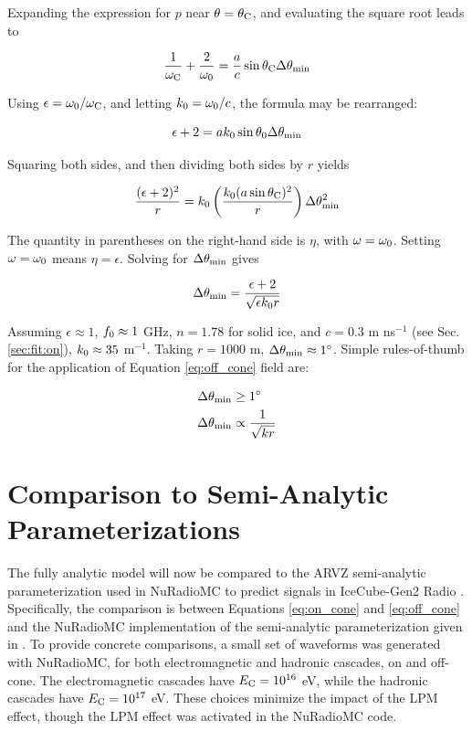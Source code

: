 \documentclass[amsmath,amssymb,aps,prd,10pt,twocolumn]{revtex4}
\begin{document}
Expanding the expression for $p$ near $\theta = \theta_{\rm C}$, and evaluating the square root leads to

\begin{equation}
\frac{1}{\omega_{\rm C}} + \frac{2}{\omega_{\rm 0}} = \frac{a}{c}\sin\theta_{\rm C} \Delta\theta_{\rm min}
\end{equation}

Using $\epsilon = \omega_{\rm 0}/\omega_{\rm C}$, and letting $k_{\rm 0} = \omega_{\rm 0}/c$, the formula may be rearranged:

\begin{equation}
\epsilon + 2 = a k_{\rm 0} \sin\theta_{\rm 0}\Delta\theta_{\rm min}
\end{equation}

Squaring both sides, and then dividing both sides by $r$ yields

\begin{equation}
\frac{(\epsilon+2)^2}{r} = k_{\rm 0} \left(\frac{k_{\rm 0} (a\sin\theta_{\rm C})^2}{r}\right)\Delta\theta^2_{\rm min}
\end{equation}

The quantity in parentheses on the right-hand side is $\eta$, with $\omega = \omega_{\rm 0}$.  Setting $\omega = \omega_{\rm 0}$ means $\eta = \epsilon$.  Solving for $\Delta\theta_{\rm min}$ gives

\begin{equation}
\Delta\theta_{\rm min} = \frac{\epsilon+2}{\sqrt{\epsilon k_{\rm 0} r}}
\end{equation}

Assuming $\epsilon \approx 1$, $f_{\rm 0} \approx 1$ GHz, $n = 1.78$ for solid ice, and $c = 0.3$ m ns$^{-1}$ (see Sec. \ref{sec:fit:on}), $k_{\rm 0} \approx 35$ m$^{-1}$.  Taking $r = 1000$ m, $\Delta\theta_{\rm min} \approx 1^{\circ}$.  Simple rules-of-thumb for the application of Equation \ref{eq:off_cone} field are:

\begin{align}
\Delta\theta_{\rm min} &\geq 1^{\circ} \\
\Delta\theta_{\rm min} &\propto \frac{1}{\sqrt{kr}}
\end{align}

\section{Comparison to Semi-Analytic Parameterizations}
\label{sec:fit}

The fully analytic model will now be compared to the ARVZ semi-analytic parameterization used in NuRadioMC to predict signals in IceCube-Gen2 Radio \cite{10.1140/epjc/s10052-020-7612-8}.  Specifically, the comparison is between Equations \ref{eq:on_cone} and \ref{eq:off_cone} and the NuRadioMC implementation of the semi-analytic parameterization given in \cite{PhysRevD.101.083005}.  To provide concrete comparisons, a small set of waveforms was generated with NuRadioMC, for both electromagnetic and hadronic cascades, on and off-cone.  The electromagnetic cascades have $E_{\rm C} = 10^{16}$ eV, while the hadronic cascades have $E_{\rm C} = 10^{17}$ eV.  These choices minimize the impact of the LPM effect, though the LPM effect was activated in the NuRadioMC code.
\end{document}
